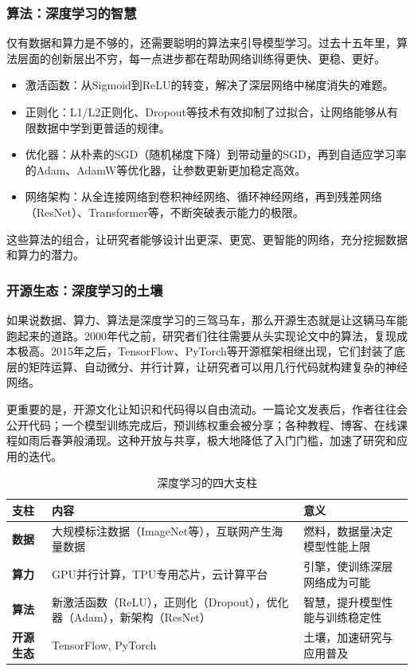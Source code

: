 \documentclass[lang=cn,zihao=-4,a4paper,fontset=windows]{beautybook}
\begin{document}
\subsubsection*{算法：深度学习的智慧}

仅有数据和算力是不够的，还需要聪明的算法来引导模型学习。过去十五年里，算法层面的创新层出不穷，每一点进步都在帮助网络训练得更快、更稳、更好。
\begin{itemize}
\item 激活函数：从Sigmoid到ReLU的转变，解决了深层网络中梯度消失的难题。
\item 正则化：L1/L2正则化、Dropout等技术有效抑制了过拟合，让网络能够从有限数据中学到更普适的规律。
\item 优化器：从朴素的SGD（随机梯度下降）到带动量的SGD，再到自适应学习率的Adam、AdamW等优化器，让参数更新更加稳定高效。
\item 网络架构：从全连接网络到卷积神经网络、循环神经网络，再到残差网络（ResNet）、Transformer等，不断突破表示能力的极限。
\end{itemize}
这些算法的组合，让研究者能够设计出更深、更宽、更智能的网络，充分挖掘数据和算力的潜力。

\subsubsection*{开源生态：深度学习的土壤}

如果说数据、算力、算法是深度学习的三驾马车，那么开源生态就是让这辆马车能跑起来的道路。2000年代之前，研究者们往往需要从头实现论文中的算法，复现成本极高。2015年之后，TensorFlow、PyTorch等开源框架相继出现，它们封装了底层的矩阵运算、自动微分、并行计算，让研究者可以用几行代码就构建复杂的神经网络。

更重要的是，开源文化让知识和代码得以自由流动。一篇论文发表后，作者往往会公开代码；一个模型训练完成后，预训练权重会被分享；各种教程、博客、在线课程如雨后春笋般涌现。这种开放与共享，极大地降低了入门门槛，加速了研究和应用的迭代。

\begin{table}[h]
\centering
\caption{深度学习的四大支柱}
\begin{tabular}{p{}p{}p{}}
\toprule
\textbf{支柱} & \textbf{内容} & \textbf{意义} \\
\midrule
\textbf{数据} & 
大规模标注数据（ImageNet等），互联网产生海量数据 &
燃料，数据量决定模型性能上限 \\
\textbf{算力} &GPU并行计算，TPU专用芯片，云计算平台
 &
引擎，使训练深层网络成为可能 \\
\textbf{算法} &
新激活函数（ReLU），正则化（Dropout），优化器（Adam），新架构（ResNet）
 &
智慧，提升模型性能与训练稳定性 \\
\textbf{开源生态} &TensorFlow, PyTorch &
土壤，加速研究与应用普及 \\
\bottomrule
\end{tabular}
\end{table}
\end{document}
